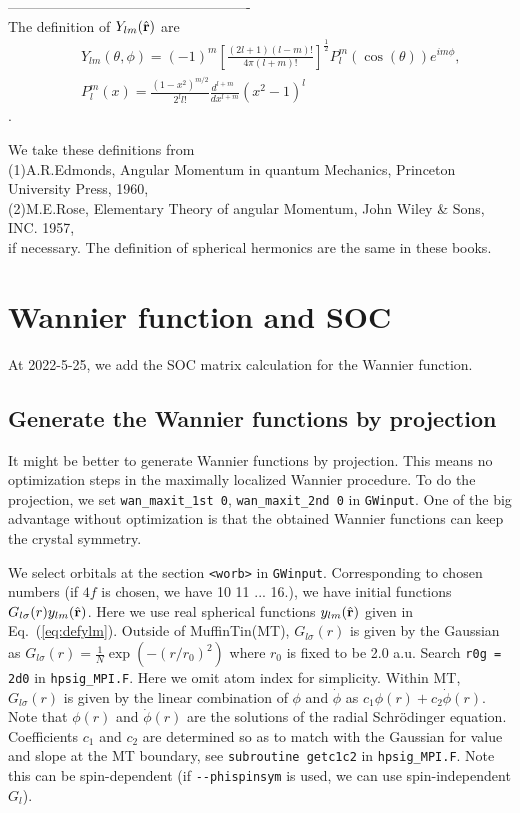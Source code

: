 \documentclass[a4paper,10pt,fleqn]{article}
\def\phidot{\dot{\phi}}
\newcommand{\bfr}{{\bf r}}
\newcommand{\req}[1]{\mbox{Eq.~(\ref{#1})}}
\begin{document}
----------------------------------------------------\\
The definition of $Y_{lm}(\hat{\bf r})$ are
\begin{eqnarray}
&&Y_{lm}(\theta, \phi)
=(-1)^m \left[ \frac{(2l+1)(l-m)!}{4 \pi (l+m)!} \right]^{\frac{1}{2}} P^m_l(\cos(\theta)) e^{i m \phi}, \\
&&P^m_l(x) = \frac{(1-x^2)^{m/2}}{2^l l!}\frac{d^{l+m} \ \ }{dx^{l+m}} (x^2-1)^l
\end{eqnarray}.

\noindent We take these definitions from\\
(1)A.R.Edmonds, Angular Momentum in quantum Mechanics, 
Princeton University Press, 1960,\\
(2)M.E.Rose, Elementary Theory of angular Momentum,
John Wiley \& Sons, INC. 1957,\\
if necessary. The definition of spherical hermonics are the same in these books.

\section{Wannier function and SOC}
At 2022-5-25, we add the SOC matrix calculation for the Wannier function.

\subsection{Generate the Wannier functions by projection}
It might be better to generate Wannier functions by projection.
This means no optimization steps in the maximally localized Wannier procedure.
To do the projection, we set \verb#wan_maxit_1st 0#, \verb#wan_maxit_2nd 0# in \verb#GWinput#.
One of the big advantage without optimization is that
the obtained Wannier functions can keep the crystal symmetry.

We select orbitals at the section \verb#<worb># in \verb$GWinput$.
Corresponding to chosen numbers 
(if $4f$ is chosen, we have 10 11 ... 16.), 
we have initial functions $G_{l \sigma}(r) y_{lm}(\hat{\bfr})$.
Here we use real spherical functions $y_{lm}(\hat{\bfr})$ given in \req{eq:defylm}.
Outside of MuffinTin(MT), $G_{l \sigma}(r)$ is given by the Gaussian as
$G_{l \sigma}(r) =\frac{1}{N} \exp( -(r/r_0)^2)$ where $r_0$ is fixed to be 2.0 a.u.
Search \verb#r0g = 2d0# in \verb#hpsig_MPI.F#. Here we omit atom index for simplicity. 
Within MT, $G_{l \sigma}(r)$ is given by the linear combination of $\phi$ and $\phidot$ as $c_1 \phi(r)+c_2 \dot{\phi}(r)$.
Note that $\phi(r)$ and $\dot{\phi}(r)$
are the solutions of the radial Schr\"odinger equation.
Coefficients $c_1$ and $c_2$ 
are determined so as to match with the Gaussian 
for value and slope at the MT boundary, see \verb$subroutine getc1c2$ 
in \verb|hpsig_MPI.F|. 
Note this can be spin-dependent (if \verb|--phispinsym| is used, we can use spin-independent $G_l$).
\end{document}
